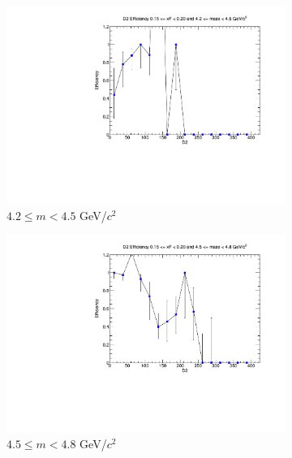 \documentclass[11pt]{article}
\begin{document}
\begin{figure}[p]
    \centering
    \begin{subfigure}[b]{0.32\textwidth}
        \centering
        \includegraphics[width=\textwidth]{./kTrackerEfficiencyPlots/D2_Efficiency_xF3_mass0.pdf}
        \caption{$4.2 \leq m < 4.5$ GeV/$c^2$}
    \end{subfigure}\hfill
    \begin{subfigure}[b]{0.32\textwidth}
        \centering
        \includegraphics[width=\textwidth]{./kTrackerEfficiencyPlots/D2_Efficiency_xF3_mass1.pdf}
        \caption{$4.5 \leq m < 4.8$ GeV/$c^2$}
    \end{subfigure}\hfill
    \begin{subfigure}[b]{0.32\textwidth}
        \centering

\end{subfigure}
\end{figure}
\end{document}
